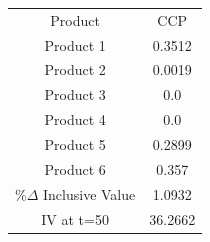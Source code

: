 \begin{tabular}{cc}
Product & CCP \\
Product 1 & 0.3512 \\
Product 2 & 0.0019 \\
Product 3 & 0.0 \\
Product 4 & 0.0 \\
Product 5 & 0.2899 \\
Product 6 & 0.357 \\
$\%\Delta$ Inclusive Value & 1.0932 \\
IV at t=50 & 36.2662 \\
\end{tabular}